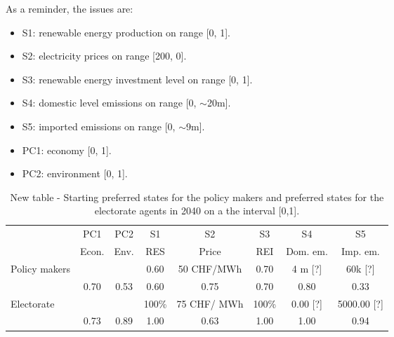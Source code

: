 \documentclass[12pt]{article}
\begin{document}
As a reminder, the issues are: 

\begin{itemize}
\item S1: renewable energy production on range [0, 1].
\item S2: electricity prices on range [200, 0]. %
\item S3: renewable energy investment level on range [0, 1].
\item S4: domestic level emissions on range [0, $\sim$20m].
\item S5: imported emissions on range [0, $\sim$9m]. %
\item PC1: economy [0, 1]. %
\item PC2: environment [0, 1]. %
\end{itemize}

\begin{table}
\begin{center}
\begin{tabular}{|l|c|c|c|c|c|c|c|} 
\hline
		& PC1		& PC2	&  S1	& S2			& S3		& S4			& S5			\\ 
		& Econ.		& Env.	& RES	& Price		& REI	& Dom. em.	& Imp. em.	\\ \hline
\multirow{2}{*}{Policy makers}
		& 			&		& 0.60	& 50 CHF/MWh	& 0.70	& 4 m [?]		& 60k [?]		\\ \cline{2-8}
		& 0.70		& 0.53	& 0.60	& 0.75		& 0.70	& 0.80		& 0.33		\\ \hline
\multirow{2}{*}{Electorate}
		&			&		&100\%	& 75 CHF/	MWh	& 100\%	& 0.00 [?]		& 5000.00	 [?]	\\ \cline{2-8}
		& 0.73		& 0.89	&1.00	& 0.63		& 1.00	& 1.00		& 0.94	 	\\ \hline
\end{tabular}
\end{center}
\caption{New table - Starting preferred states for the policy makers and preferred states for the electorate agents in 2040 on a the interval [0,1].}
\label{tab:}
\end{table}

\end{document}
